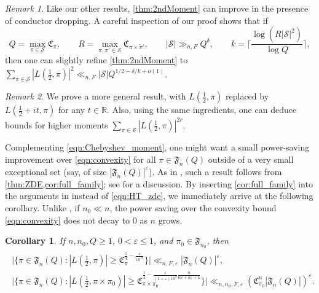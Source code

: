 \documentclass[11pt]{amsart}
\newtheorem{corollary}[theorem]{Corollary}
\theoremstyle{remark}
\newtheorem*{remark}{Remark}
\numberwithin{equation}{section}
\newcommand{\mS}{\mathcal{S}}
\renewcommand{\tilde}{\widetilde}
\renewcommand{\epsilon}{\varepsilon}
\begin{document}
\begin{remark}
Like our other results, \cref{thm:2ndMoment} can improve in the presence of conductor dropping. A careful inspection of our proof shows that if
\[
Q = \max_{\pi\in\mathcal{S}}\mathfrak{C}_{\pi},\qquad R = \max_{\pi,\pi'\in\mathcal{S}}\mathfrak{C}_{\pi\times\tilde{\pi}'},\qquad |\mathcal{S}|\gg_{n,F}Q^{\delta},\qquad k=\Big\lceil\frac{\log(R|\mathcal{S}|^2)}{\log Q}\Big\rceil,
\]
then one can slightly refine \cref{thm:2ndMoment} to $\sum_{\pi\in\mathcal{S}}|L(\tfrac{1}{2},\pi)|^2\ll_{n,F} |\mathcal{S}| Q^{1/2 - \delta/k+o(1)}$.
\end{remark}

\begin{remark}
We prove a more general result, with $L(\frac{1}{2},\pi)$ replaced by $L(\frac{1}{2}+it,\pi)$ for any $t\in\mathbb{R}$.  Also, using the same ingredients, one can deduce bounds for higher moments $\sum_{\pi \in \mS} |L(\tfrac{1}{2}, \pi)|^{2r}$.
\end{remark}

Complementing \eqref{eqn:Chebyshev_moment}, one might want a small power-saving improvement over \eqref{eqn:convexity} for all $\pi\in\mathfrak{F}_n(Q)$ outside of a very small exceptional set (say, of size $|\mathfrak{F}_n(Q)|^{\epsilon}$).  As in \cite{humphries2024zeros,TZ_GLn}, such a result follows from \cref{thm:ZDE,cor:full_family}; see \cite[Section 2.1]{humphries2024zeros} for a discussion. By inserting \cref{cor:full_family} into the arguments in \cite[Section 6]{humphries2024zeros} instead of \eqref{eqn:HT_zde}, we immediately arrive at the following corollary. Unlike \cite{humphries2024zeros,TZ_GLn}, if $n_0\ll n$, the power saving over the convexity bound \eqref{eqn:convexity} does not decay to $0$ as $n$ grows.

\begin{corollary}
\label{cor:subconvex}
If $n,n_0,Q\geq 1$, $0<\epsilon\leq 1$, and $\pi_0\in\mathfrak{F}_{n_0}$, then
\begin{align*}
\begin{gathered}
\Big|\Big\{\pi\in\mathfrak{F}_n(Q)\colon |L(\tfrac{1}{2},\pi)|\geq \mathfrak{C}_{\pi}^{\frac{1}{4}-\frac{\epsilon}{10^{12}}}\Big\}\Big|\ll_{n,F,\epsilon}|\mathfrak{F}_n(Q)|^{\epsilon},\label{eqn:subconvex}\\
\Big|\Big\{\pi\in\mathfrak{F}_n(Q)\colon |L(\tfrac{1}{2},\pi\times\pi_0)|\geq \mathfrak{C}_{\pi\times\pi_0}^{\frac{1}{4}-\frac{\epsilon}{(1+\epsilon)10^9}\frac{n}{6n+n_0+4}}\Big\}\Big|\ll_{n,n_0,F,\epsilon}(\mathfrak{C}_{\pi_0}^n|\mathfrak{F}_n(Q)|)^{\epsilon}.
\end{gathered}
\end{align*}
\end{corollary}
\end{document}
